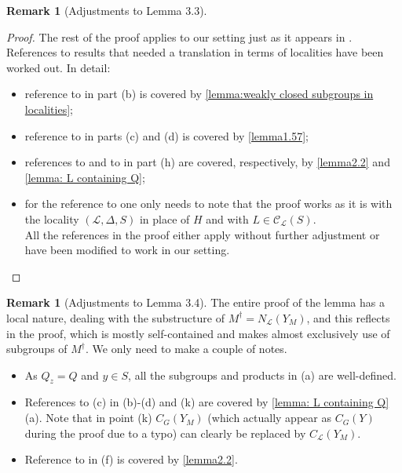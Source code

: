 \documentclass{amsart}
\numberwithin{equation}{section}
\theoremstyle{definition}
\newtheorem{remark}[equation]{Remark}
\theoremstyle{subresult}
\theoremstyle{caseresult}
\renewcommand{\L}{\mathcal{L}}
\newcommand{\C}{\mathcal{C}}
\newcommand{\<}{\langle}
\renewcommand{\>}{\rangle}
\begin{document}
\begin{remark}[Adjustments to Lemma 3.3]
\begin{proof}
	The rest of the proof applies to our setting just as it appears in \cite{Meier-Stell-Stroth:2012}. References to results that needed a translation in terms of localities have been worked out. In detail:
	\begin{itemize}
		\item[(i)] reference to \cite[Lemma 1.24]{Meier-Stell-Stroth:2012} in part (b) is covered by \ref{lemma:weakly closed subgroups in localities};
		\item[(ii)] reference to \cite[Lemma 1.57]{Meier-Stell-Stroth:2012} in parts (c) and (d) is covered by \ref{lemma1.57};
		\item[(iii)] references to \cite[Lemma 2.2]{Meier-Stell-Stroth:2012} and to \cite[Lemma 1.52]{Meier-Stell-Stroth:2012} in part (h) are covered, respectively, by \ref{lemma2.2} and \ref{lemma: L containing Q};
        \item[(iv)] for the reference to \cite[Lemma 1.58]{Meier-Stell-Stroth:2012} one only needs to note that the proof works as it is with the locality $(\L,\Delta,S)$ in place of $H$ and with $L \in \C_\L(S)$. \\
        All the references in the proof either apply without further adjustment or have been modified to work in our setting.
	\end{itemize}
\end{proof}
\end{remark}

\begin{remark}[Adjustments to Lemma 3.4]\label{lemma3.4}
	The entire proof of the lemma has a local nature, dealing with the substructure of $M^\dagger=N_\L(Y_M)$, and this reflects in the proof, which is mostly self-contained and makes almost exclusively use of subgroups of $M^\dagger$. We only need to make a couple of notes.
	\begin{itemize}
		\item[(i)] As $Q_z=Q$ and $y \in S$, all the subgroups and products in (a) are well-defined.
		\item[(ii)] References to \cite[Lemma 1.52]{Meier-Stell-Stroth:2012}(c) in (b)-(d) and (k) are covered by \ref{lemma: L containing Q}(a). Note that in point (k) $C_G(Y_M)$ (which actually appear as $C_G(Y)$ during the proof due to a typo) can clearly be replaced by $C_\L(Y_M)$.
		\item[(iii)] Reference to \cite[Lemma 2.2]{Meier-Stell-Stroth:2012} in (f) is covered by \ref{lemma2.2}.
	\end{itemize}
\end{remark}
\end{document}

